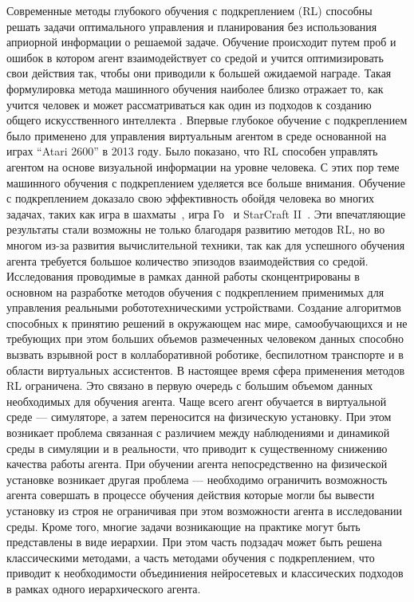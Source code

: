 Современные методы глубокого обучения с подкреплением (RL) способны решать задачи оптимального управления и планирования без использования априорной информации о решаемой задаче. Обучение происходит путем проб и ошибок в котором агент взаимодействует со средой и учится оптимизировать свои действия так, чтобы они приводили к большей ожидаемой награде. Такая формулировка метода машинного обучения наиболее близко отражает то, как учится человек и может рассматриваться как один из подходов к созданию общего искусственного интеллекта \cite{reward_is_enough}. Впервые глубокое обучение с подкреплением было применено для управления виртуальным агентом в среде основанной на играх ``Atari 2600'' в 2013 году\cite{mnih2013atari}. Было показано, что RL способен управлять агентом на основе визуальной информации на уровне человека. С этих пор теме машинного обучения с подкреплением уделяется все больше внимания. Обучение с подкреплением доказало свою эффективность обойдя человека во многих задачах, таких как игра в шахматы~\cite{alphazero}, игра Го~\cite{alphago} и StarCraft II~\cite{alphastar}. Эти впечатляющие результаты стали возможны не только благодаря развитию методов RL, но во многом из-за развития вычислительной техники, так как для успешного обучения агента требуется большое количество эпизодов взаимодействия со средой. Исследования проводимые в рамках данной работы сконцентрированы в основном на разработке методов обучения с подкреплением применимых для управления реальными робототехническими устройствами. Создание алгоритмов способных к принятию решений в окружающем нас мире, самообучающихся и не требующих при этом больших объемов размеченных человеком данных способно вызвать взрывной рост в коллаборативной роботике, беспилотном транспорте и в области виртуальных ассистентов.
В настоящее время сфера применения методов RL ограничена. Это связано в первую очередь с большим объемом данных необходимых для обучения агента. Чаще всего агент обучается в виртуальной среде --- симуляторе, а затем переносится на физическую установку. При этом возникает проблема связанная с различием между наблюдениями и динамикой среды в симуляции и в реальности, что приводит к существенному снижению качества работы агента. При обучении агента непосредственно на физической установке возникает другая проблема --- необходимо ограничить возможность агента совершать в процессе обучения действия которые могли бы вывести установку из строя не ограничивая при этом возможности агента в исследовании среды. Кроме того, многие задачи возникающие на практике могут быть представлены в виде иерархии. При этом часть подзадач может быть решена классическими методами, а часть методами обучения с подкреплением, что приводит к необходимости объединиения нейросетевых и классических подходов в рамках одного иерархического агента. 


